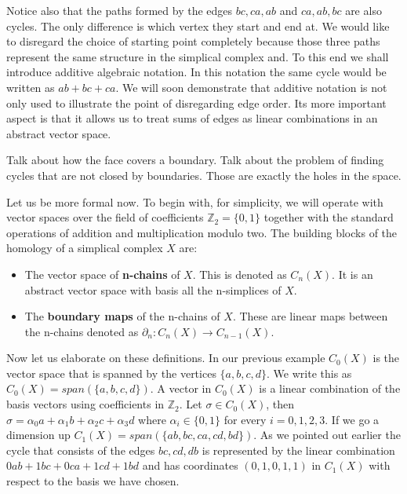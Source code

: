 Notice also that the paths formed by the edges $bc, ca, ab$ and $ca, ab, bc$ are also cycles. The only difference is which vertex they start and end at. We would like to disregard the choice of starting point completely because those three paths represent the same structure in the simplical complex and. To this end we shall introduce additive algebraic notation. In this notation the same cycle would be written as $ab + bc + ca$.  We will soon demonstrate that additive notation is not only used to illustrate the point of disregarding edge order. Its more important aspect is that it allows us to treat sums of edges as linear combinations in an abstract vector space.


Talk about how the face covers a boundary. Talk about the problem of finding cycles that are not closed by boundaries. Those are exactly the holes in the space.

Let us be more formal now. To begin with, for simplicity, we will operate with vector spaces over the field of coefficients $\mathbb{Z}_2 = \{0, 1\}$ together with the standard operations of addition and multiplication modulo two. The building blocks of the homology of a simplical complex $X$ are:


\begin{itemize}
    \item The vector space of \textbf{n-chains} of $X$. This is denoted as $C_n(X)$. It is an abstract vector space with basis all the n-simplices of $X$.
    \item The \textbf{boundary maps} of the n-chains of $X$. These are linear maps between the n-chains denoted as $\partial_n : C_n(X) \to C_{n-1}(X)$.
\end{itemize}

Now let us elaborate on these definitions. In our previous example $C_0(X)$ is the vector space that is spanned by the vertices $\{a, b, c, d\}$. We write this as $C_0(X) = span(\{a, b, c, d\})$. A vector in $C_0(X)$ is a linear combination of the basis vectors using coefficients in $\mathbb{Z}_2$. Let $\sigma \in C_0(X)$, then $\sigma  = \alpha_0a + \alpha_1b + \alpha_2c + \alpha_3d$ where $\alpha_i \in \{0 ,1\}$ for every $i = 0, 1, 2, 3$. If we go a dimension up $C_1(X) = span(\{ab, bc, ca, cd, bd\})$. As we pointed out earlier the cycle that consists of the edges $bc, cd, db$ is represented by the linear combination $0ab + 1bc + 0ca + 1cd + 1bd$ and has coordinates $(0, 1, 0, 1, 1)$ in $C_1(X)$ with respect to the basis we have chosen.

